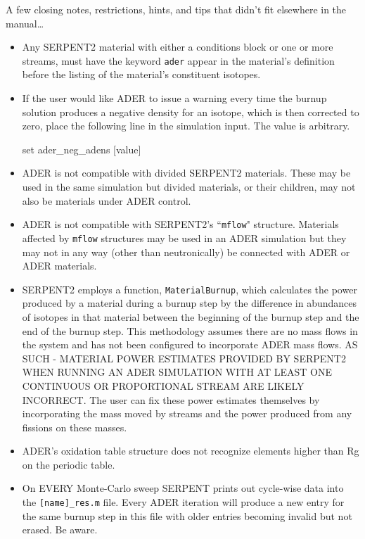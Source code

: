 A few closing notes, restrictions, hints, and tips that didn't fit 
elsewhere in the manual\ldots

\begin{itemize}
\item{Any SERPENT2 material with either a conditions block or one or more
streams, must have the keyword \texttt{ader} appear in the material's definition
before the listing of the material's constituent isotopes.}
\item{If the user would like ADER to issue a warning every time the burnup
solution produces a negative density for an isotope, which is then corrected to
zero, place the following line in the simulation input. The value is arbitrary.
\begin{lt}
set ader_neg_adens [value]
\end{lt}
    }
\item{ADER is not compatible with divided SERPENT2 materials. These may be used
in the same simulation but divided materials, or their children, may not also
be materials under ADER control.}
\item{ADER is not compatible with SERPENT2's ``\texttt{mflow}" structure.
Materials affected by \texttt{mflow} structures may be used in an ADER
simulation but they may not in any way (other than neutronically) be connected
with ADER or ADER materials.}
\item{SERPENT2 employs a function, \texttt{MaterialBurnup}, which calculates
the power produced by a material during a burnup step by the difference
in abundances of isotopes in that material between the beginning of the burnup
step and the end of the burnup step. This methodology assumes there are no
mass flows in the system and has not been configured to incorporate ADER mass
flows. AS SUCH - MATERIAL POWER ESTIMATES PROVIDED BY SERPENT2 WHEN RUNNING
AN ADER SIMULATION WITH AT LEAST ONE CONTINUOUS OR PROPORTIONAL STREAM ARE
LIKELY INCORRECT. The user can fix these power estimates themselves by 
incorporating the mass moved by streams and the power produced from any 
fissions on these masses.}
\item{ADER's oxidation table structure does not recognize elements higher
than Rg on the periodic table.}
\item{On EVERY Monte-Carlo sweep SERPENT prints out cycle-wise data into the
\texttt{[name]\_res.m} file. Every ADER iteration will produce a new entry for
the same burnup step in this file with older entries becoming invalid but
not erased. Be aware.}
\end{itemize}
